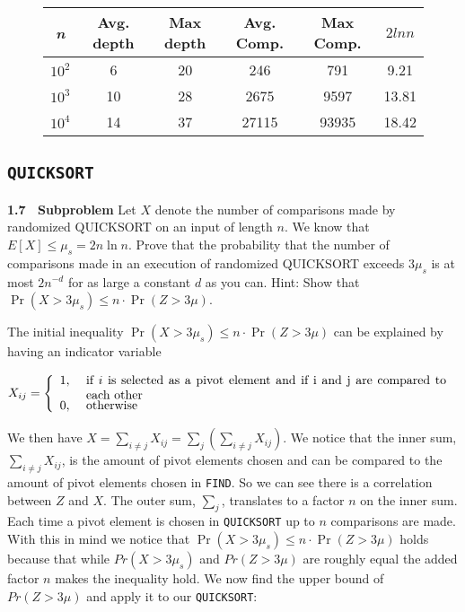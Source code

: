 \documentclass[article,a4paper,oneside]{article}
\newcommand{\+}[1]{\ensuremath{\boldsymbol{#1}}}
\begin{document}
\begin{center}
\begin{figure}
\begin{tabular}{| c | c | c | c | c | c |}
\hline
\emph{n} & Avg. depth & Max depth & Avg. Comp. & Max Comp. & $2lnn$\\ \hline
$10^2$ & 6 & 20 & 246 & 791 & 9.21 \\ \hline
$10^3$ & 10 & 28 & 2675 & 9597 & 13.81 \\ \hline
$10^4$ & 14 & 37 & 27115 & 93935 & 18.42\\ \hline
\end{tabular}	
\label{table:find}
\end{figure}
\end{center}
\subsection*{\texttt{QUICKSORT}}

{\bf 1.7 \ Subproblem} Let $X$ denote the number of comparisons made by
randomized QUICKSORT on an input of length $n$. We know that $E[X]
\leq \mu_s= 2n\ln n$.  Prove that the probability that the number of
comparisons made in an execution of randomized QUICKSORT exceeds
$3\mu_s$ is at most $2n^{-d}$ for as large a constant $d$ as you can.
Hint: Show that $\Pr(X>3\mu_s)\leq n\cdot\Pr(Z>3\mu)$.

The initial inequality $\Pr(X>3\mu_s)\leq n\cdot\Pr(Z>3\mu)$ can be explained by having an indicator variable

$$X_{ij}=\left\{\begin{array}{ll}
1, & \mbox{
\begin{minipage}[t]{4in}
  if $i$ is selected as a pivot element and if i and j are compared to each other 
\end{minipage}
}
\\
0, & \mbox{ otherwise}
\end{array}\right.$$

We then have $X = \sum_{i \neq j} X_{ij} = \sum_j \left( \sum_{i \neq j} X_{ij} \right)$. We notice that the inner sum, $ \sum_{i \neq j} X_{ij}$, is the amount of pivot elements chosen and can be compared to the amount of pivot elements chosen in \texttt{FIND}. So we can see there is a correlation between $Z$ and $X$. The outer sum, $\sum_j$, translates to a factor $n$ on the inner sum. Each time a pivot element is chosen in \texttt{QUICKSORT} up to $n$ comparisons are made. With this in mind we notice that $\Pr(X>3\mu_s)\leq n\cdot\Pr(Z>3\mu)$ holds because that while $Pr(X > 3\mu_s)$ and $Pr(Z > 3\mu)$ are roughly equal the added factor $n$ makes the inequality hold. We now find the upper bound of $Pr(Z > 3\mu)$ and apply it to our \texttt{QUICKSORT}:
\end{document}

